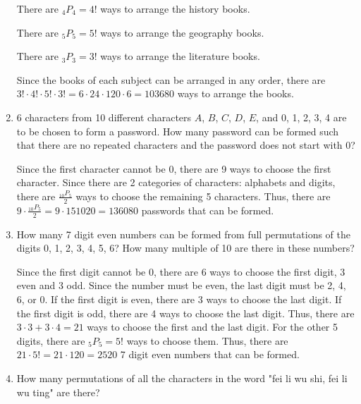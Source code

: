 \documentclass{report}
\newcommand\permtwo[2][^n]{{}_{#1}P_{#2}}
\begin{document}
\begin{multicols}{2}
\begin{enumerate}
          \sol{}

          There are $\permtwo[4]{4} = 4!$ ways to arrange the history books.

          There are $\permtwo[5]{5} = 5!$ ways to arrange the geography books.

          There are $\permtwo[3]{3} = 3!$ ways to arrange the literature books.

          Since the books of each subject can be arranged in any order, there are $3!
            \cdot 4! \cdot 5! \cdot 3! = 6 \cdot 24 \cdot 120 \cdot 6 = 103680$ ways to
          arrange the books.

    \item 6 characters from 10 different characters $A$, $B$, $C$, $D$, $E$, and 0, 1, 2, 3, 4 are to be chosen to form a password. How many password can be formed such that there are no repeated characters and the password does not start with 0?
          \sol{}

          Since the first character cannot be 0, there are 9 ways to choose the first
          character. Since there are 2 categories of characters: alphabets and digits,
          there are $\frac{\permtwo[10]{5}}{2}$ ways to choose the remaining 5
          characters. Thus, there are $9 \cdot \frac{\permtwo[10]{5}}{2} = 9 \cdot 151020
            = 136080$ passwords that can be formed.

    \item How many 7 digit even numbers can be formed from full permutations of the
          digits 0, 1, 2, 3, 4, 5, 6? How many multiple of 10 are there in these numbers?
          \sol{}

          Since the first digit cannot be 0, there are 6 ways to choose the first digit,
          3 even and 3 odd. Since the number must be even, the last digit must be 2, 4,
          6, or 0. If the first digit is even, there are 3 ways to choose the last digit.
          If the first digit is odd, there are 4 ways to choose the last digit. Thus,
          there are $3 \cdot 3 + 3 \cdot 4 = 21$ ways to choose the first and the last
          digit. For the other 5 digits, there are $\permtwo[5]{5} = 5!$ ways to choose
          them. Thus, there are $21 \cdot 5! = 21 \cdot 120 = 2520$ 7 digit even numbers
          that can be formed.

    \item How many permutations of all the characters in the word "fei li wu shi, fei li
          wu ting" are there? \sol{}


\end{enumerate}
\end{multicols}
\end{document}
